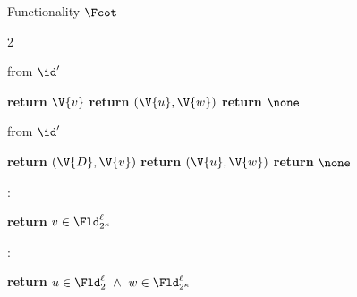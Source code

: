 \begin{interface}[nofloat]{Functionality $\Fcot$ \\
\params{$\PID$, \quad $\Ps$, \quad $\admits$, \quad
$\uses := \{(\Adv,\serves)\}$, \quad $\pars := \kappa$}}
{\begin{multicols}{2}
\columnbreak

 \quad from $\id'$
\begin{algorithmic}[1]
\algcont
{}
  \State \textbf{return} $\V{v}$ \label{ln:cotsenderout}
\EndIf
{}
  \State \textbf{return} $(\V{u}, \V{w})$ \label{ln:cotreceiverout}
\EndIf
\State \textbf{return} $\none$
\algsave
\end{algorithmic}
\vspace{1.4ex}

 \quad from $\id'$
\begin{algorithmic}[1]
\algcont
{}
  \State \textbf{return} $(\V{D}, \V{v})$ \label{ln:cotleaksender}
\EndIf
{}
  \State \textbf{return} $(\V{u}, \V{w})$ \label{ln:cotleakreceiver}
\EndIf
\State \textbf{return} $\none$
\algsave
\end{algorithmic}
\vspace{1.4ex}

:
\begin{algorithmic}[1]
\algcont
\State \textbf{return} $v \in \Fld_{2^{\kappa}}^{\ell}$
\algsave
\end{algorithmic}
\vspace{1.4ex}

:
\begin{algorithmic}[1]
\algcont
\State \textbf{return} $u \in \Fld_{2}^{\ell} \ \wedge\ w \in \Fld_{2^{\kappa}}^{\ell}$
\algsave
\end{algorithmic}
\end{multicols}}
\end{interface}
